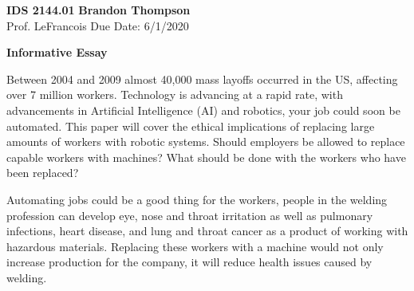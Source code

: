\documentclass[12pt]{article}
\begin{document}
\noindent
\textbf{IDS 2144.01} \hfill \textbf{Brandon Thompson} \\
\normalsize Prof. LeFrancois \hfill Due Date: 6/1/2020 \\

\begin{center}
\textbf{Informative Essay}
\end{center}

	Between 2004 and 2009 almost 40,000 mass layoffs occurred in the US, affecting over
	7 million workers. \autocite{sucher} Technology is advancing at a rapid rate, with
	advancements in Artificial Intelligence (AI) and robotics, your job could soon be
	automated. This paper will cover the ethical implications of replacing large amounts
	of workers with robotic systems. Should employers be allowed to replace capable workers
	with machines? What should be done with the workers who have been replaced?
	
	Automating jobs could be a good thing for the workers, people in the welding profession
	can develop eye, nose and throat irritation as well as pulmonary infections, heart
	disease, and lung and throat cancer as a product of working with hazardous materials.
	\autocite{pham} Replacing these workers with a machine would not only increase production
	for the company, it will reduce health issues caused by welding.

	\newpage
	\printbibliography
\end{document}
